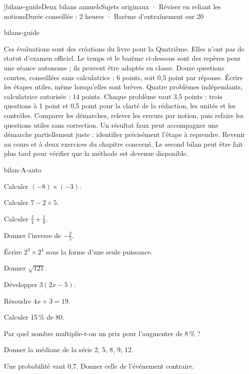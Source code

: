 \editionPage[\pdfbookmark[0]{Deux bilans annuels}{bm-bilans-guide-parent}]{bilans-guide}{Deux bilans annuels}{Sujets originaux · Réviser en reliant les notions}{Durée conseillée : 2 heures · Barème d’entraînement sur 20}
\begin{blocEdition}{bilans-guide}

Ces évaluations sont des créations du livre pour la Quatrième. Elles n’ont
pas de statut d’examen officiel. Le temps et le barème ci-dessous sont des
repères pour une séance autonome ; ils peuvent être adaptés en classe.
Douze questions courtes, conseillées sans calculatrice : 6 points, soit
0,5 point par réponse. Écrire les étapes utiles, même lorsqu’elles sont brèves.
Quatre problèmes indépendants, calculatrice autorisée : 14 points.
Chaque problème vaut 3,5 points : trois questions à 1 point et 0,5 point
pour la clarté de la rédaction, les unités et les contrôles.
Comparer les démarches, relever les erreurs par notion, puis refaire
les questions utiles sans correction. Un résultat faux peut accompagner
une démarche partiellement juste : identifier précisément l’étape à reprendre.
Revenir au cours et à deux exercices du chapitre concerné. Le second
bilan peut être fait plus tard pour vérifier que la méthode est devenue disponible.

\end{blocEdition}
\begin{blocEdition}{bilan-A-auto}
\begin{questions}
\item Calculer $(-8)\times(-3)$.
\item Calculer $7-2\times5$.
\item Calculer $\frac34+\frac18$.
\item Donner l’inverse de $-\frac25$.
\item Écrire $2^3\times2^4$ sous la forme d’une seule puissance.
\item Donner $\sqrt{121}$.
\item Développer $3(2x-5)$.
\item Résoudre $4x+3=19$.
\item Calculer 15\,\% de 80.
\item Par quel nombre multiplie-t-on un prix pour l’augmenter de 8\,\% ?
\item Donner la médiane de la série 2, 5, 8, 9, 12.
\item Une probabilité vaut 0,7. Donner celle de l’événement contraire.\end{questions}
\end{blocEdition}

